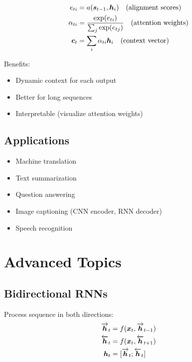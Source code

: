\begin{align}
e_{ti} &= a(\boldsymbol{s}_{t-1}, \boldsymbol{h}_i) \quad \text{(alignment scores)} \\
\alpha_{ti} &= \frac{\exp(e_{ti})}{\sum_j \exp(e_{tj})} \quad \text{(attention weights)} \\
\boldsymbol{c}_t &= \sum_i \alpha_{ti} \boldsymbol{h}_i \quad \text{(context vector)}
\end{align}

Benefits:
\begin{itemize}
    \item Dynamic context for each output
    \item Better for long sequences
    \item Interpretable (visualize attention weights)
\end{itemize}

\subsection{Applications}

\begin{itemize}
    \item Machine translation
    \item Text summarization
    \item Question answering
    \item Image captioning (CNN encoder, RNN decoder)
    \item Speech recognition
\end{itemize}

\section{Advanced Topics}
\label{sec:rnn-advanced}

\subsection{Bidirectional RNNs}

Process sequence in both directions:
\begin{align}
\overrightarrow{\boldsymbol{h}}_t &= f(\boldsymbol{x}_t, \overrightarrow{\boldsymbol{h}}_{t-1}) \\
\overleftarrow{\boldsymbol{h}}_t &= f(\boldsymbol{x}_t, \overleftarrow{\boldsymbol{h}}_{t+1}) \\
\boldsymbol{h}_t &= [\overrightarrow{\boldsymbol{h}}_t; \overleftarrow{\boldsymbol{h}}_t]
\end{align}

